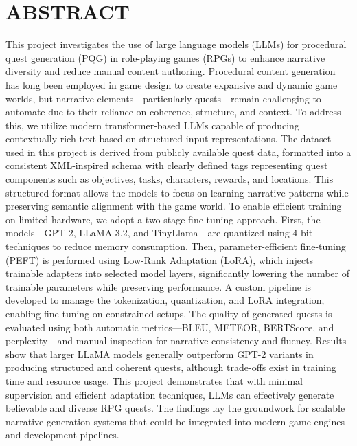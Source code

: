 \clearpage

\section*{\centering \large ABSTRACT}

\vspace{2em}

\begin{doublespace}
  \justifying
  \noindent
  This project investigates the use of large language models (LLMs) for procedural quest
  generation (PQG) in role-playing games (RPGs) to enhance narrative diversity and reduce
  manual content authoring. Procedural content generation has long been employed in game
  design to create expansive and dynamic game worlds, but narrative elements—particularly
  quests—remain challenging to automate due to their reliance on coherence, structure, and
  context. To address this, we utilize modern transformer-based LLMs capable of producing
  contextually rich text based on structured input representations. The dataset used
  in this project is derived from publicly available quest data, formatted into a consistent
  XML-inspired schema with clearly defined tags representing quest components such as
  objectives, tasks, characters, rewards, and locations. This structured format allows the
  models to focus on learning narrative patterns while preserving semantic alignment with
  the game world. To enable efficient training on limited hardware, we adopt a two-stage
  fine-tuning approach. First, the models—GPT-2, LLaMA 3.2, and TinyLlama—are quantized
  using 4-bit techniques to reduce memory consumption. Then, parameter-efficient
  fine-tuning (PEFT) is performed using Low-Rank Adaptation (LoRA), which injects trainable
  adapters into selected model layers, significantly lowering the number of trainable
  parameters while preserving performance. A custom pipeline is developed to manage the
  tokenization, quantization, and LoRA integration, enabling fine-tuning on constrained setups.
  The quality of generated quests is evaluated using both automatic metrics—BLEU,
  METEOR, BERTScore, and perplexity—and manual inspection for narrative consistency
  and fluency. Results show that larger LLaMA models generally outperform GPT-2 variants
  in producing structured and coherent quests, although trade-offs exist in training
  time and resource usage. This project demonstrates that with minimal supervision and
  efficient adaptation techniques, LLMs can effectively generate believable and diverse RPG
  quests. The findings lay the groundwork for scalable narrative generation systems that
  could be integrated into modern game engines and development pipelines.
\end{doublespace}

\newpage
